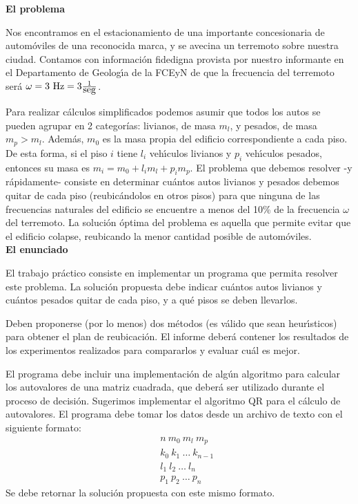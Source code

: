 \documentclass[a4paper]{article}
\begin{document}
\textbf{El problema}

Nos encontramos en el 
estacionamiento de una importante concesionaria de autom\' oviles de una reconocida marca,
y se avecina un terremoto sobre nuestra ciudad. 
Contamos con informaci\'on fidedigna provista por nuestro
informante en el Departamento de Geolog\'\i a de la FCEyN 
de que la frecuencia del terremoto ser\'a $\omega = 3\ \hbox{Hz}
= 3 \frac{1}{\hbox{seg}}$.

Para realizar c\'alculos simplificados podemos asumir que todos los autos 
se pueden agrupar en 2 categor\'ias: livianos, de masa $m_l$, y pesados, 
de masa $m_p > m_l$.
Adem\'as, $m_0$ es la masa propia del edificio correspondiente a cada piso.
De esta forma, si el piso $i$ tiene $l_i$ veh\'\i culos livianos y 
$p_i$ veh\'\i culos pesados, entonces su masa es $m_i = m_0 + l_i m_l + p_i m_p$. 
El problema que debemos resolver -y r\'apidamente- consiste en determinar
cu\'antos autos livianos y pesados debemos quitar de cada piso 
(reubic\'andolos en otros pisos) para que ninguna de las frecuencias 
naturales del edificio se encuentre a menos del 10\% de la frecuencia 
$\omega$ del terremoto.
La soluci\'on \'optima del problema es aquella que permite evitar que el
edificio colapse, reubicando la menor cantidad posible de autom\'oviles.\\

\textbf{El enunciado}

El trabajo pr\'actico consiste en implementar un programa que permita 
resolver este problema. La soluci\'on propuesta debe indicar cu\'antos 
autos livianos y cu\'antos pesados quitar de cada piso, y a qu\'e pisos 
se deben llevarlos. 

Deben proponerse (por lo menos) dos m\'etodos (es v\'alido que sean 
heur\'\i sticos) para obtener el plan de reubicaci\'on. El informe 
deber\'a contener los resultados de los experimentos realizados para
compararlos y evaluar cu\'al es mejor. 

El programa debe incluir una implementaci\'on de
alg\'un algoritmo para calcular los autovalores de una matriz cuadrada, que
deber\'a ser utilizado durante el proceso de decisi\'on. Sugerimos implementar
el algoritmo QR para el c\'alculo de autovalores. El programa debe tomar los
datos desde un archivo de texto con el siguiente formato:
\begin{eqnarray}
 & & n\ m_0\ m_l\ m_p \nonumber \\
 & & k_0\ k_1\ \dots\ k_{n-1} \nonumber \\
 & & l_1\ l_2\ \dots\ l_n \nonumber \\
 & & p_1\ p_2\ \dots\ p_n \nonumber
\end{eqnarray}
Se debe retornar la soluci\'on propuesta con este mismo formato.
\end{document}
